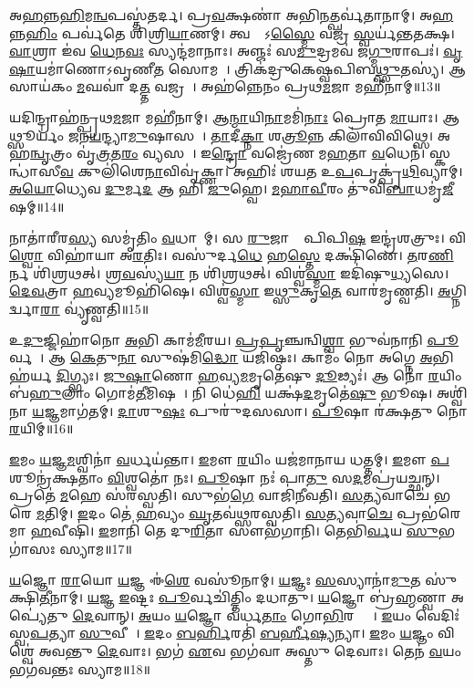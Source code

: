 𑌅\ul{𑌹}𑌨𑍍𑌨\ul{𑌹𑌿}𑌮\ul{𑌨𑍍𑌵}𑌪𑌸𑍍𑌤॑𑌤𑌰𑍍𑌦।
𑌪𑍍𑌰\ul{𑌵}𑌕𑍍𑌷𑌣𑌾॑ 𑌅𑌭𑌿\ul{𑌨}𑌤𑍍𑌪𑌰𑍍𑌵॑𑌤𑌾𑌨𑌾𑌮𑍍।
𑌅\ul{𑌹}𑌨𑍍𑌨\ul{𑌹𑌿𑌂} 𑌪𑌰𑍍𑌵॑𑌤𑍇 𑌶𑌿𑌶𑍍𑌰𑌿\ul{𑌯𑌾}𑌣𑌮𑍍।
𑌤𑍍𑌵𑌷𑍍𑌟𑌾᳚\-𑌽\ul{𑌸𑍍𑌮𑍈} 𑌵𑌜𑍍𑌰॑ \ul{𑌸𑍍𑌵}𑌰𑍍𑌯॑𑌨𑍍𑌤𑌤𑌕𑍍𑌷।
\ul{𑌵𑌾}𑌶𑍍𑌰𑌾 𑌇॑𑌵 \ul{𑌧𑍇}𑌨\ul{𑌵𑌃} 𑌸𑍍𑌯𑌨𑍍𑌦॑𑌮𑌾𑌨𑌾𑌃।
𑌅𑌞𑍍𑌜𑌃॑ 𑌸\ul{𑌮𑍁}𑌦𑍍𑌰𑌮𑌵॑ 𑌜\ul{𑌗𑍍𑌮𑍁}𑌰𑌾𑌪𑌃॑।
\ul{𑌵𑍃}\ul{𑌷𑌾}𑌯𑌮𑌾॑𑌣𑍋\-𑌽𑌵𑍃𑌣𑍀\ul{𑌤} 𑌸𑍋𑌮𑌮𑍍᳚।
𑌤𑍍𑌰𑌿𑌕॑𑌦𑍍𑌰𑍁𑌕𑍇𑌷𑍍𑌵𑌪𑌿𑌬\ul{𑌥𑍍𑌸𑍁}𑌤𑌸𑍍𑌯॑।
𑌆 𑌸𑌾𑌯॑𑌕𑌂 \ul{𑌮}𑌘𑌵𑌾॑ 𑌦\ul{𑌤𑍍𑌤} 𑌵𑌜𑍍𑌰𑌮𑍍᳚।
𑌅𑌹॑𑌨𑍍𑌨𑍇𑌨𑌂 𑌪𑍍𑌰𑌥\ul{𑌮}𑌜𑌾 𑌮𑌹𑍀॑𑌨𑌾𑌮𑍍॥13॥

𑌯𑌦𑌿𑌨𑍍𑌦𑍍𑌰𑌾𑌹॑𑌨𑍍𑌪𑍍𑌰𑌥\ul{𑌮}𑌜𑌾 𑌮𑌹𑍀॑𑌨𑌾𑌮𑍍।
𑌆\ul{𑌨𑍍𑌮𑌾}𑌯𑌿\ul{𑌨𑌾}𑌮𑌮𑌿॑\ul{𑌨𑌾𑌃} 𑌪𑍍𑌰𑍋𑌤 \ul{𑌮𑌾}𑌯𑌾𑌃।
𑌆𑌥𑍍𑌸𑍂𑌰𑍍𑌯𑌂॑ \ul{𑌜}𑌨\ul{𑌯}𑌨𑍍𑌦𑍍𑌯𑌾\ul{𑌮𑍁}𑌷𑌾𑌸𑌮𑍍᳚।
\ul{𑌤𑌾}𑌦𑍀\ul{𑌕𑍍𑌨𑌾} 𑌶\ul{𑌤𑍍𑌰𑍂}𑌨𑍍𑌨 𑌕𑌿𑌲𑌾॑𑌵𑌿𑌵𑌿𑌥𑍍𑌸𑍇।
𑌅𑌹॑\ul{𑌨𑍍𑌵𑍃}𑌤𑍍𑌰𑌂 𑌵𑍃॑\ul{𑌤𑍍𑌰}𑌤\ul{𑌰𑌂} 𑌵𑍍𑌯𑌸𑌮𑍍᳚।
𑌇\ul{𑌨𑍍𑌦𑍍𑌰𑍋} 𑌵𑌜𑍍𑌰𑍇॑𑌣 𑌮\ul{𑌹}𑌤𑌾 \ul{𑌵}𑌧𑍇𑌨॑।
𑌸𑍍𑌕𑌨𑍍𑌧𑌾॑𑌸𑍀\ul{𑌵} 𑌕𑍁𑌲𑌿॑𑌶𑍇\ul{𑌨𑌾}𑌵𑌿𑌵𑍃॑𑌕𑍍𑌣𑌾।
𑌅𑌹𑌿𑌃॑ 𑌶𑌯𑌤 𑌉\ul{𑌪}𑌪𑍃𑌕𑍍𑌪𑍃॑\ul{𑌥𑌿}𑌵𑍍𑌯𑌾𑌮𑍍।
\ul{𑌅}\ul{𑌯𑍋}𑌧𑍍𑌯𑍇𑌵 \ul{𑌦𑍁}𑌰𑍍𑌮\ul{𑌦} 𑌆 𑌹𑌿 \ul{𑌜𑍁}𑌹𑍍𑌵𑍇।
\ul{𑌮}\ul{𑌹𑌾}\ul{𑌵𑍀}𑌰𑌂 𑌤𑍁॑𑌵𑌿\ul{𑌬𑌾}𑌧𑌮𑍃॑\ul{𑌜𑍀}𑌷𑌮𑍍॥14॥

𑌨𑌾𑌤𑌾॑𑌰𑍀𑌰\ul{𑌸𑍍𑌯} 𑌸𑌮𑍃॑𑌤𑌿𑌂 \ul{𑌵}𑌧𑌾𑌨𑌾᳚𑌮𑍍।
𑌸 \ul{𑌰𑍁}𑌜𑌾𑌨𑌾𑌃᳚ 𑌪𑌿𑌪𑌿\ul{𑌷} 𑌇𑌨𑍍𑌦𑍍𑌰॑𑌶𑌤𑍍𑌰𑍁𑌃।
𑌵𑌿\ul{𑌶𑍍𑌵𑍋} 𑌵𑌿𑌹𑌾॑𑌯𑌾 𑌅\ul{𑌰}𑌤𑌿𑌃।
𑌵𑌸𑍁॑𑌰𑍍𑌦\ul{𑌧𑍇} 𑌹\ul{𑌸𑍍𑌤𑍇} 𑌦𑌕𑍍𑌷𑌿॑𑌣𑍇।
\ul{𑌤}𑌰\ul{𑌣𑌿}𑌰𑍍𑌨 𑌶𑌿॑𑌶𑍍𑌰𑌥𑌤𑍍।
\ul{𑌶𑍍𑌰}\ul{𑌵}𑌸𑍍𑌯॑\ul{𑌯𑌾} 𑌨 𑌶𑌿॑𑌶𑍍𑌰𑌥𑌤𑍍।
𑌵𑌿𑌶𑍍𑌵॑\ul{𑌸𑍍𑌮𑌾} 𑌇𑌦𑌿॑𑌷𑍁\ul{𑌧𑍍𑌯}𑌸𑍇।
\ul{𑌦𑍇}\ul{𑌵}𑌤𑍍𑌰𑌾 \ul{𑌹}𑌵𑍍𑌯𑌮𑍂𑌹𑌿॑𑌷𑍇।
𑌵𑌿𑌶𑍍𑌵॑\ul{𑌸𑍍𑌮𑌾} 𑌇\ul{𑌥𑍍𑌸𑍁}𑌕𑍃\ul{𑌤𑍇} 𑌵𑌾𑌰॑𑌮𑍃𑌣𑍍𑌵𑌤𑌿।
\ul{𑌅}𑌗𑍍𑌨𑌿𑌰𑍍𑌦𑍍𑌵𑌾\ul{𑌰𑌾} 𑌵𑍍𑌯𑍃॑𑌣𑍍𑌵𑌤𑌿॥15॥

𑌉\ul{𑌦𑍁}𑌜𑍍𑌜𑌿𑌹𑌾॑𑌨𑍋 \ul{𑌅}𑌭𑌿 𑌕𑌾𑌮॑\ul{𑌮𑍀}𑌰𑌯\sn{}।
\ul{𑌪𑍍𑌰}\ul{𑌪𑍃}𑌞𑍍𑌚𑌨𑍍𑌵𑌿\ul{𑌶𑍍𑌵𑌾} 𑌭𑍁𑌵॑𑌨𑌾𑌨𑌿 \ul{𑌪𑍂}𑌰𑍍𑌵𑌥𑌾᳚।
𑌆 \ul{𑌕𑍇}𑌤𑍁\ul{𑌨𑌾} 𑌸𑍁𑌷॑𑌮𑌿\ul{𑌦𑍍𑌧𑍋} 𑌯𑌜𑌿॑𑌷𑍍𑌠𑌃।
𑌕𑌾𑌮𑌂॑ 𑌨𑍋 𑌅𑌗𑍍𑌨𑍇 \ul{𑌅}𑌭𑌿𑌹॑𑌰𑍍𑌯 \ul{𑌦𑌿}𑌗𑍍𑌭𑍍𑌯𑌃।
\ul{𑌜𑍁}\ul{𑌷𑌾}𑌣𑍋 \ul{𑌹}𑌵𑍍𑌯\ul{𑌮}𑌮𑍃𑌤𑍇॑𑌷𑍁 \ul{𑌦𑍂}𑌢𑍍𑌯𑌃॑।
𑌆 𑌨𑍋॑ \ul{𑌰}𑌯𑌿𑌂 𑌬॑\ul{𑌹𑍁}𑌲𑌾𑌂 𑌗𑍋𑌮॑\ul{𑌤𑍀}𑌮𑌿𑌷𑌮𑍍᳚।
𑌨𑌿 𑌧𑍇॑\ul{𑌹𑌿} 𑌯𑌕𑍍𑌷॑\ul{𑌦}𑌮𑍃𑌤𑍇॑\ul{𑌷𑍁} 𑌭𑍂𑌷\sn{}।
𑌅𑌶𑍍𑌵𑌿॑𑌨𑌾 \ul{𑌯}𑌜𑍍𑌞𑌮𑌾𑌗॑𑌤𑌮𑍍।
\ul{𑌦𑌾}𑌶𑍁\ul{𑌷𑌃} 𑌪𑍁𑌰𑍁॑𑌦𑌸𑌸𑌾।
\ul{𑌪𑍂}𑌷𑌾 𑌰॑𑌕𑍍𑌷𑌤𑍁 𑌨𑍋 \ul{𑌰}𑌯𑌿𑌮𑍍॥16॥

\ul{𑌇}𑌮𑌂 \ul{𑌯}𑌜𑍍𑌞\ul{𑌮}𑌶𑍍𑌵𑌿𑌨𑌾॑ \ul{𑌵}𑌰𑍍𑌧𑌯॑𑌨𑍍𑌤𑌾।
\ul{𑌇}𑌮𑍗 \ul{𑌰}𑌯𑌿𑌂 𑌯𑌜॑𑌮𑌾𑌨𑌾𑌯 𑌧𑌤𑍍𑌤𑌮𑍍।
\ul{𑌇}𑌮𑍗 \ul{𑌪}𑌶𑍂𑌨𑍍𑌰॑𑌕𑍍𑌷𑌤𑌾𑌂 \ul{𑌵𑌿}𑌶𑍍𑌵𑌤𑍋॑ 𑌨𑌃।
\ul{𑌪𑍂}𑌷𑌾 𑌨𑌃॑ 𑌪𑌾\ul{𑌤𑍁} 𑌸\ul{𑌦}𑌮𑌪𑍍𑌰॑𑌯𑌚𑍍𑌛𑌨𑍍।
𑌪𑍍𑌰𑌤𑍇॑ \ul{𑌮}𑌹𑍇 𑌸॑𑌰𑌸𑍍𑌵𑌤𑌿।
𑌸𑍁𑌭॑\ul{𑌗𑍇} 𑌵𑌾𑌜𑌿॑𑌨𑍀𑌵𑌤𑌿।
\ul{𑌸}\ul{𑌤𑍍𑌯}𑌵𑌾𑌚𑍇॑ 𑌭𑌰𑍇 \ul{𑌮}𑌤𑌿𑌮𑍍।
\ul{𑌇}𑌦𑌂 𑌤𑍇॑ \ul{𑌹}𑌵𑍍𑌯𑌂 \ul{𑌘𑍃}𑌤𑌵॑𑌥𑍍𑌸𑌰𑌸𑍍𑌵𑌤𑌿।
\ul{𑌸}\ul{𑌤𑍍𑌯}𑌵𑌾\ul{𑌚𑍇} 𑌪𑍍𑌰𑌭॑𑌰𑍇𑌮𑌾 \ul{𑌹}𑌵𑍀𑌷𑌿॑।
\ul{𑌇}𑌮𑌾𑌨𑌿॑ 𑌤𑍇 𑌦𑍁\ul{𑌰𑌿}𑌤𑌾 𑌸𑍗𑌭॑𑌗𑌾𑌨𑌿।
𑌤𑍇𑌭𑌿॑\ul{𑌰𑍍𑌵}𑌯 \ul{𑌸𑍁}𑌭𑌗𑌾॑𑌸𑌃 𑌸𑍍𑌯𑌾𑌮॥17॥\anuvakamend[\ul{𑌵}𑌜𑍍𑌰𑍍𑌯𑌹𑍀॑𑌨𑌾𑌮𑍃\ul{𑌜𑍀}𑌷𑌂 𑌵𑍍𑌯𑍃॑𑌣𑍍𑌵𑌤𑌿 𑌰𑌕𑍍𑌷𑌤𑍁 𑌨𑍋 \ul{𑌰}𑌯𑌿\dng{ꣳ} 𑌸𑍗𑌭॑\ul{𑌗𑌾}𑌨𑍍𑌯𑍇𑌕𑌂॑ 𑌚]

\ul{𑌯}𑌜𑍍𑌞𑍋 \ul{𑌰𑌾}𑌯𑍋 \ul{𑌯}𑌜𑍍𑌞 𑌈॑\ul{𑌶𑍇} 𑌵𑌸𑍂॑𑌨𑌾𑌮𑍍।
\ul{𑌯}𑌜𑍍𑌞𑌃 \ul{𑌸}𑌸𑍍𑌯𑌾𑌨𑌾॑\ul{𑌮𑍁}𑌤 𑌸𑍁॑𑌕𑍍𑌷𑌿\ul{𑌤𑍀}𑌨𑌾𑌮𑍍।
\ul{𑌯}𑌜𑍍𑌞 \ul{𑌇}𑌷𑍍𑌟𑌃 \ul{𑌪𑍂}𑌰𑍍𑌵𑌚𑌿॑𑌤𑍍𑌤𑌿𑌂 𑌦𑌧𑌾𑌤𑍁।
\ul{𑌯}𑌜𑍍𑌞𑍋 𑌬𑍍𑌰॑\ul{𑌹𑍍𑌮}𑌣𑍍𑌵𑌾 𑌅𑌪𑍍𑌯𑍇॑𑌤𑍁 \ul{𑌦𑍇}𑌵𑌾𑌨𑍍।
\ul{𑌅}𑌯𑌂 \ul{𑌯}𑌜𑍍𑌞𑍋 𑌵॑𑌰𑍍𑌧\ul{𑌤𑌾𑌂} 𑌗𑍋\ul{𑌭𑌿}𑌰𑌶𑍍𑌵𑍈𑌃᳚।
\ul{𑌇}𑌯𑌂 𑌵𑍇𑌦𑌿𑌃॑ 𑌸𑍍𑌵\ul{𑌪}𑌤𑍍𑌯𑌾 \ul{𑌸𑍁}𑌵𑍀𑌰𑌾᳚।
\ul{𑌇}𑌦𑌂 \ul{𑌬}\ul{𑌰𑍍}𑌹𑌿𑌰𑌤𑌿॑ \ul{𑌬}\ul{𑌰𑍍}𑌹𑍀\ul{𑌷𑍍𑌯}𑌨𑍍𑌯𑌾।
\ul{𑌇}𑌮𑌂 \ul{𑌯}𑌜𑍍𑌞𑌂 𑌵𑌿𑌶𑍍𑌵𑍇॑ 𑌅𑌵𑌨𑍍𑌤𑍁 \ul{𑌦𑍇}𑌵𑌾𑌃।
𑌭𑌗॑ \ul{𑌏}𑌵 𑌭𑌗॑𑌵𑌾 𑌅𑌸𑍍𑌤𑍁 𑌦𑍇𑌵𑌾𑌃।
𑌤𑍇𑌨॑ \ul{𑌵}𑌯𑌂 𑌭𑌗॑𑌵𑌨𑍍𑌤𑌃 𑌸𑍍𑌯𑌾𑌮॥18॥

